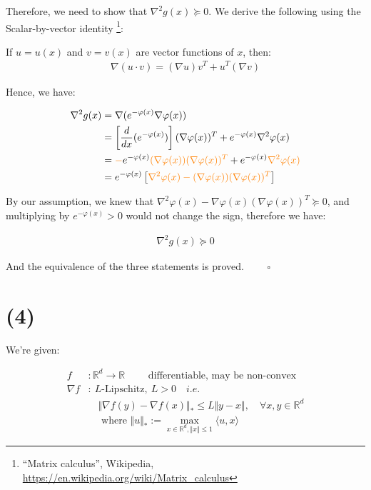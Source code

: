 \documentclass{article}
\begin{document}
Therefore, we need to show that $\nabla^2 g(x) \succeq 0$.
We derive the following using the Scalar-by-vector identity
\footnote{``Matrix calculus'', Wikipedia, \url{https://en.wikipedia.org/wiki/Matrix_calculus}}:
\bigskip

If $u = u(x)$ and $v = v(x)$ are vector functions of $x$, then:
\begin{align*}
    \nabla (u \cdot v) = (\nabla u) v^T + u^T (\nabla v)
\end{align*}

Hence, we have:

\begin{align*}
    \nabla^2 g(x) 
    &= \nabla(e^{-\varphi(x)} \nabla \varphi(x)) \\
    &= \left[ \frac{d}{dx}(e^{-\varphi(x)}) \right] (\nabla \varphi(x))^T + e^{-\varphi(x)} \nabla^2 \varphi(x) \\
    &= \textcolor{orange}{-} e^{-\varphi(x)} \textcolor{orange}{(\nabla \varphi(x))(\nabla \varphi(x))^T} + e^{-\varphi(x)} \textcolor{orange}{\nabla^2 \varphi(x)} \\
    &= e^{-\varphi(x)} \left[ \textcolor{orange}{\nabla^2 \varphi(x) - (\nabla \varphi(x))(\nabla \varphi(x))^T} \right]
\end{align*}

By our assumption, we knew that $\nabla^2 \varphi(x) - \nabla \varphi(x) (\nabla \varphi(x))^T \succeq 0$,
and multiplying by $e^{-\varphi(x)} > 0$ would not change the sign, therefore we have:

\begin{align*}
    \nabla^2 g(x) \succeq 0
\end{align*}

And the equivalence of the three statements is proved. $\qquad \square$

\section*{(4)}

We're given:

\begin{align*}
    f&: \mathbb{R}^d \to \mathbb{R} \qquad \text{ differentiable, may be non-convex} \\
    \nabla f&: \ L\text{-Lipschitz}, \ L > 0 \quad i.e. \\
    &\quad \Vert \nabla f ( y ) - \nabla f ( x ) \Vert_* \leq L \Vert y - x \Vert , \quad \forall x, y \in \mathbb{R}^d \\
    &\quad \text{ where } \Vert u \Vert_* := \underset{x \in \mathbb{R}^d, \Vert x \Vert \leq 1}{\max} \langle u, x \rangle 
\end{align*}
\end{document}
